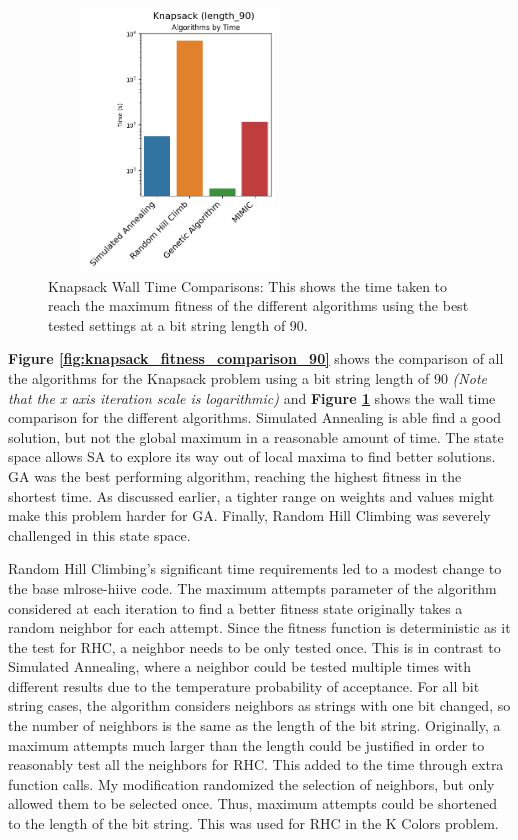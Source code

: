 \documentclass[letterpaper]{article} %
\begin{document}
\begin{figure}[!htb]
\centering
\includegraphics[width=2.75in, height=2.75in]{figures/Knapsack_length_90_Algorithms_by_Time_.png}
\caption{Knapsack Wall Time Comparisons: This shows the time taken to reach the maximum fitness of the different algorithms using the best tested settings at a bit string length of 90.  }
\label{fig:knapsack_walltime_comparison_90}
\end{figure}

\textbf{Figure \ref{fig:knapsack_fitness_comparison_90}} shows the comparison of all the algorithms for the Knapsack problem using a bit string length of 90 \emph{(Note that the x axis iteration scale is logarithmic)} and \textbf{Figure \ref{fig:knapsack_walltime_comparison_90}} shows the wall time comparison for the different algorithms.  Simulated Annealing is able find a good solution, but not the global maximum in a reasonable amount of time. The state space allows SA to explore its way out of local maxima to find better solutions.  GA was the best performing algorithm, reaching the highest fitness in the shortest time.  As discussed earlier, a tighter range on weights and values might make this problem harder for GA.  Finally, Random Hill Climbing was severely challenged in this state space.  

Random Hill Climbing's significant time requirements led to a modest change to the base mlrose-hiive code.  The maximum attempts parameter of the algorithm considered at each iteration to find a better fitness state originally takes a random neighbor for each attempt.  Since the fitness function is deterministic as it the test for RHC, a neighbor needs to be only tested once.  This is in contrast to Simulated Annealing, where a neighbor could be tested multiple times with different results due to the temperature probability of acceptance.  For all bit string cases, the algorithm considers neighbors as strings with one bit changed, so the number of neighbors is the same as the length of the bit string.  Originally, a maximum attempts much larger than the length could be justified in order to reasonably test all the neighbors for RHC.  This added to the time through extra function calls.  My modification randomized the selection of neighbors, but only allowed them to be selected once.  Thus, maximum attempts could be shortened to the length of the bit string.  This was used for RHC in the K Colors problem. 
\end{document}
